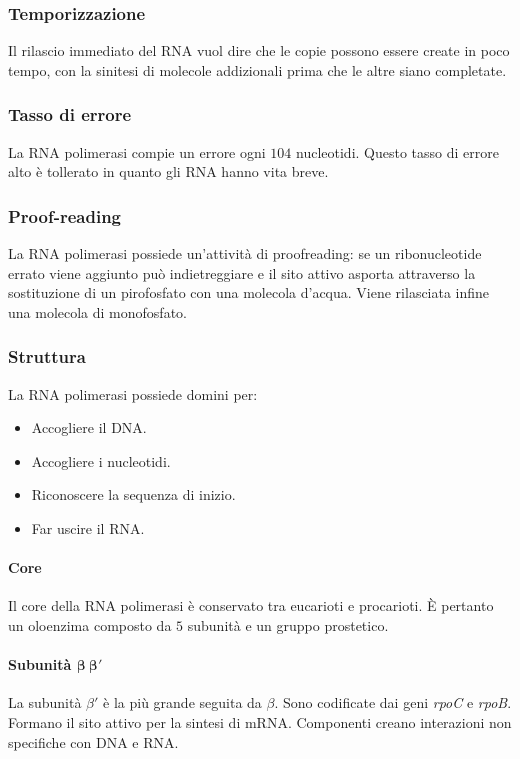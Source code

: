		\subsubsection{Temporizzazione}
		Il rilascio immediato del RNA vuol dire che le copie possono essere create in poco tempo, con la sinitesi di molecole addizionali prima che le altre siano completate.

		\subsubsection{Tasso di errore}
		La RNA polimerasi compie un errore ogni $104$ nucleotidi.
		Questo tasso di errore alto \`e tollerato in quanto gli RNA hanno vita breve.

		\subsubsection{Proof-reading}
		La RNA polimerasi possiede un'attivit\`a di proofreading: se un ribonucleotide errato viene aggiunto pu\`o indietreggiare e il sito attivo asporta attraverso la sostituzione di un pirofosfato con una molecola d'acqua.
		Viene rilasciata infine una molecola di monofosfato.

		\subsubsection{Struttura}
		La RNA polimerasi possiede domini per:
		\begin{multicols}{2}
			\begin{itemize}
				\item Accogliere il DNA.
				\item Accogliere i nucleotidi.
				\item Riconoscere la sequenza di inizio.
				\item Far uscire il RNA.
			\end{itemize}
		\end{multicols}

			\paragraph{Core}
			Il core della RNA polimerasi \`e conservato tra eucarioti e procarioti.
			\`E pertanto un oloenzima composto da $5$ subunit\`a e un gruppo prostetico.

			\paragraph{Subunit\`a $\mathbf{\beta\ \beta'}$}
			La subunit\`a $\beta'$ \`e la pi\`u grande seguita da $\beta$.
			Sono codificate dai geni \emph{rpoC} e \emph{rpoB}.
			Formano il sito attivo per la sintesi di mRNA.
			Componenti creano interazioni non specifiche con DNA e RNA.

